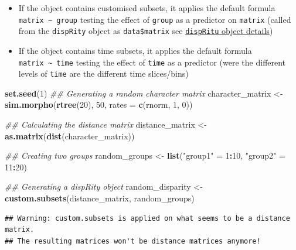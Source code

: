 \documentclass[
]{book}
\newenvironment{Shaded}{\begin{snugshade}}{\end{snugshade}}
\newcommand{\CommentTok}[1]{\textcolor[rgb]{0.56,0.35,0.01}{\textit{#1}}}
\newcommand{\DataTypeTok}[1]{\textcolor[rgb]{0.13,0.29,0.53}{#1}}
\newcommand{\DecValTok}[1]{\textcolor[rgb]{0.00,0.00,0.81}{#1}}
\newcommand{\KeywordTok}[1]{\textcolor[rgb]{0.13,0.29,0.53}{\textbf{#1}}}
\newcommand{\NormalTok}[1]{#1}
\newcommand{\OperatorTok}[1]{\textcolor[rgb]{0.81,0.36,0.00}{\textbf{#1}}}
\newcommand{\StringTok}[1]{\textcolor[rgb]{0.31,0.60,0.02}{#1}}
\providecommand{\tightlist}{%
  \setlength{\itemsep}{0pt}\setlength{\parskip}{0pt}}
\begin{document}
\begin{itemize}
\tightlist
\item
  If the object contains customised subsets, it applies the default formula \texttt{matrix\ \textasciitilde{}\ group} testing the effect of \texttt{group} as a predictor on \texttt{matrix} (called from the \texttt{dispRity} object as \texttt{data\$matrix} see \protect\hyperlink{The-dispRity-object-content}{\texttt{dispRitu} object details})
\item
  If the object contains time subsets, it applies the default formula \texttt{matrix\ \textasciitilde{}\ time} testing the effect of \texttt{time} as a predictor (were the different levels of \texttt{time} are the different time slices/bins)
\end{itemize}

\begin{Shaded}
\begin{Highlighting}[]
\KeywordTok{set.seed}\NormalTok{(}\DecValTok{1}\NormalTok{)}
\CommentTok{\#\# Generating a random character matrix}
\NormalTok{character\_matrix \textless{}{-}}\StringTok{ }\KeywordTok{sim.morpho}\NormalTok{(}\KeywordTok{rtree}\NormalTok{(}\DecValTok{20}\NormalTok{), }\DecValTok{50}\NormalTok{,}
                               \DataTypeTok{rates =} \KeywordTok{c}\NormalTok{(rnorm, }\DecValTok{1}\NormalTok{, }\DecValTok{0}\NormalTok{))}

\CommentTok{\#\# Calculating the distance matrix}
\NormalTok{distance\_matrix \textless{}{-}}\StringTok{ }\KeywordTok{as.matrix}\NormalTok{(}\KeywordTok{dist}\NormalTok{(character\_matrix))}

\CommentTok{\#\# Creating two groups}
\NormalTok{random\_groups \textless{}{-}}\StringTok{ }\KeywordTok{list}\NormalTok{(}\StringTok{"group1"}\NormalTok{ =}\StringTok{ }\DecValTok{1}\OperatorTok{:}\DecValTok{10}\NormalTok{, }\StringTok{"group2"}\NormalTok{ =}\StringTok{ }\DecValTok{11}\OperatorTok{:}\DecValTok{20}\NormalTok{)}

\CommentTok{\#\# Generating a dispRity object}
\NormalTok{random\_disparity \textless{}{-}}\StringTok{ }\KeywordTok{custom.subsets}\NormalTok{(distance\_matrix, random\_groups)}
\end{Highlighting}
\end{Shaded}

\begin{verbatim}
## Warning: custom.subsets is applied on what seems to be a distance matrix.
## The resulting matrices won't be distance matrices anymore!
\end{verbatim}
\end{document}
